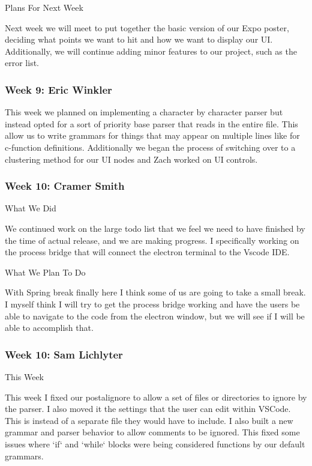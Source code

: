 Plans For Next Week

Next week we will meet to put together the basic version of our Expo poster, deciding what points we want to hit and how we want to display our UI. Additionally, we will continue adding minor features to our project, such as the error list. \\ 

 \subsubsection{Week 9: Eric Winkler}

This week we planned on implementing a character by character parser but instead opted for a sort of priority base parser that reads in the entire file. This allow us to write grammars for things that may appear on multiple lines like for c-function definitions. Additionally we began the process of switching over to a clustering method for our UI nodes and Zach worked on UI controls. \\ 

 \subsubsection{Week 10: Cramer Smith}

What We Did



We continued work on the large todo list that we feel we need to have finished by the time of actual release, and we are making progress. I specifically working on the process bridge that will connect the electron terminal to the Vscode IDE. 



What We Plan To Do



With Spring break finally here I think some of us are going to take a small break. I myself think I will try to get the process bridge working and have the users be able to navigate to the code from the electron window, but we will see if I will be able to accomplish that. \\ 

 \subsubsection{Week 10: Sam Lichlyter}

This Week

This week I fixed our postalignore to allow a set of files or directories to ignore by the parser. I also moved it the settings that the user can edit within VSCode. This is instead of a separate file they would have to include. I also built a new grammar and parser behavior to allow comments to be ignored. This fixed some issues where `if` and `while` blocks were being considered functions by our default grammars. \\ 

